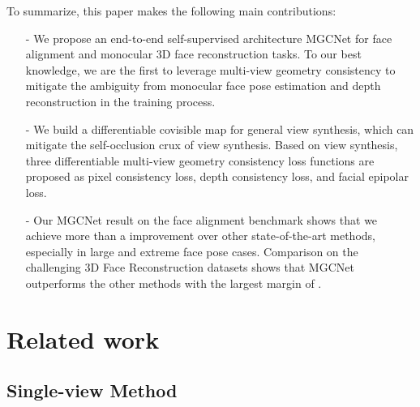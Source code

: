 \documentclass[runningheads]{llncs}
\begin{document}
To summarize, this paper makes the following main contributions:
\begin{itemize}
\setlength{\itemsep}{0pt}
\setlength{\parsep}{0pt}
\setlength{\parskip}{0pt}
\item[-] We propose an end-to-end self-supervised architecture MGCNet for face alignment and monocular 3D face reconstruction tasks. To our best knowledge, we are the first to leverage multi-view geometry consistency to mitigate the ambiguity from monocular face pose estimation and depth reconstruction in the training process.
\item[-] We build a differentiable covisible map for general view synthesis, which can mitigate the self-occlusion crux of view synthesis. Based on view synthesis, three differentiable multi-view geometry consistency loss functions are proposed as pixel consistency loss, depth consistency loss, and facial epipolar loss.
\item[-] Our MGCNet result on the face alignment benchmark \cite{dataset_aflw20003D_300WLP_zhu2016face} shows that we achieve more than a  improvement over other state-of-the-art methods, especially in large and extreme face pose cases. Comparison on the challenging 3D Face Reconstruction datasets \cite{dataset_florence,dataset_bu3dfe_yin20063d,dataset_bu4dfe_yin20063d,dataset_frgc} shows that MGCNet outperforms the other methods with the largest margin of .
\end{itemize}











%
 \section{Related work}
\begin{comment}
\subsection{3D Morphable Face Model} 
Blanz and Vetter \cite{intro_3dmm_blanz1999morphable} introduce the 3D morphable model (3DMM). 
3DMM benefits the 3D face reconstruction by constraining the solution space, thereby simplifying the problem. 
In this paper, our goal is to estimate 3DMM parameters from a single photograph. 
\end{comment}
\subsection{Single-view Method} 
\end{document}
